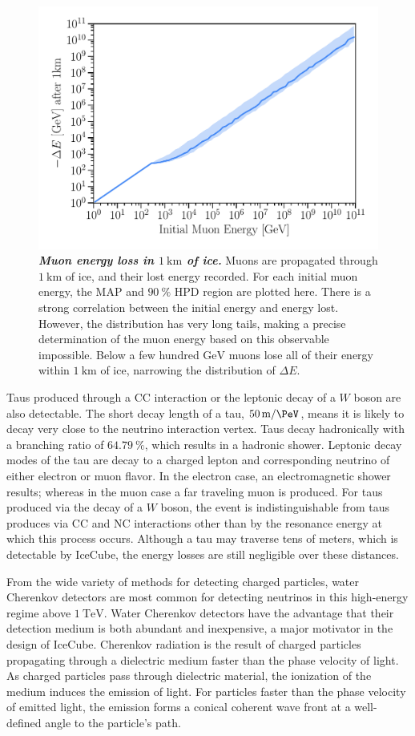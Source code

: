 \begin{figure}
	\centering
	\includegraphics[width=0.8\linewidth]{figures/muon_energy}
	\internallinenumbers
	\caption{\textbf{\textit{Muon energy loss in $\SI{1}\km$ of ice.}}
	Muons are propagated through $\SI{1}\km$ of ice, and their lost energy recorded.
	For each initial muon energy, the MAP and $\SI{90}\percent$ HPD region are plotted here.
	There is a strong correlation between the initial energy and energy lost.
	However, the distribution has very long tails, making a precise determination of the muon energy based on this observable impossible.
	Below a few hundred $\si\GeV$ muons lose all of their energy within $\SI{1}\km$ of ice, narrowing the distribution of $\Delta E$.
	}\label{fig:muon_energy}
\end{figure}

Taus produced through a CC interaction or the leptonic decay of a $W$ boson are also detectable.
The short decay length of a tau, $\SI{50}\meter / \si\PeV$, means it is likely to decay very close to the neutrino interaction vertex.
Taus decay hadronically with a branching ratio of $\SI{64.79}\percent$, which results in a hadronic shower.
Leptonic decay modes of the tau are decay to a charged lepton and corresponding neutrino of either electron or muon flavor.
In the electron case, an electromagnetic shower results; whereas in the muon case a far traveling muon is produced.
For taus produced via the decay of a $W$ boson, the event is indistinguishable from taus produces via CC and NC interactions other than by the resonance energy at which this process occurs.
Although a tau may traverse tens of meters, which is detectable by IceCube, the energy losses are still negligible over these distances.

From the wide variety of methods for detecting charged particles, water Cherenkov detectors are most common for detecting neutrinos in this high-energy regime above $\SI{1}\TeV$.
Water Cherenkov detectors have the advantage that their detection medium is both abundant and inexpensive, a major motivator in the design of IceCube.
Cherenkov radiation is the result of charged particles propagating through a dielectric medium faster than the phase velocity of light.
As charged particles pass through dielectric material, the ionization of the medium induces the emission of light.
For particles faster than the phase velocity of emitted light, the emission forms a conical coherent wave front at a well-defined angle to the particle's path.

